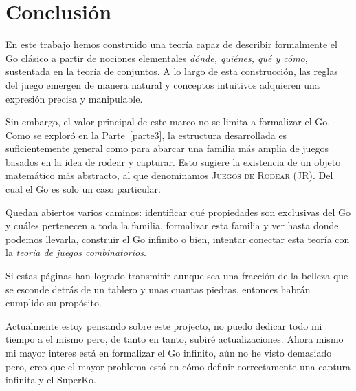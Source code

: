 \section{Conclusión}

En este trabajo hemos construido una teoría capaz de describir formalmente el Go clásico a partir de nociones elementales \textit{dónde, quiénes, qué y cómo}, sustentada en la teoría de conjuntos. A lo largo de esta construcción, las reglas del juego emergen de manera natural y conceptos intuitivos adquieren una expresión precisa y manipulable.

Sin embargo, el valor principal de este marco no se limita a formalizar el Go. Como se exploró en la Parte~\ref{parte3}, la estructura desarrollada es suficientemente general como para abarcar una familia más amplia de juegos basados en la idea de rodear y capturar. Esto sugiere la existencia de un objeto matemático más abstracto, al que denominamos \textsc{Juegos de Rodear} (\textsc{JR}). Del cual el Go es solo un caso particular.

Quedan abiertos varios caminos: identificar qué propiedades son exclusivas del Go y cuáles pertenecen a toda la familia, formalizar esta familia y ver hasta donde podemos llevarla, construir el Go infinito o bien, intentar conectar esta teoría con la \textit{teoría de juegos combinatorios}.

Si estas páginas han logrado transmitir aunque sea una fracción de la belleza que se esconde detrás de un tablero y unas cuantas piedras, entonces habrán cumplido su propósito.

Actualmente estoy pensando sobre este projecto, no puedo dedicar todo mi tiempo a el mismo pero, de tanto en tanto, subiré actualizaciones. Ahora mismo mi mayor interes está en formalizar el Go infinito, aún no he visto demasiado pero, creo que el mayor problema está en cómo definir correctamente una captura infinita y el SuperKo.
